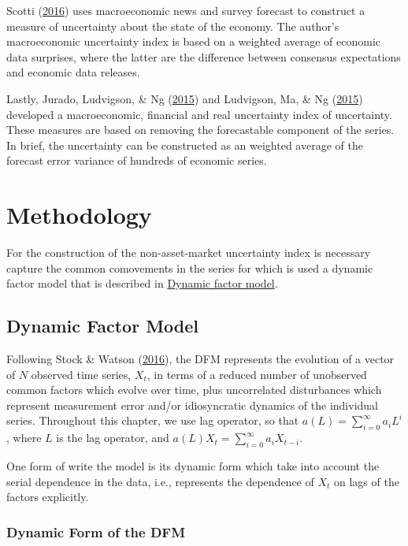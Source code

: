 \documentclass[12pt,twoside]{reedthesis}
\begin{document}
Scotti (\protect\hyperlink{ref-scotti:2016}{2016}) uses macroeconomic news and survey forecast to construct a measure of uncertainty about the state of the economy. The author's macroeconomic uncertainty index is based on a weighted average of economic data surprises, where the latter are the difference between consensus expectations and economic data releases.

Lastly, Jurado, Ludvigson, \& Ng (\protect\hyperlink{ref-juraetal:2015}{2015}) and Ludvigson, Ma, \& Ng (\protect\hyperlink{ref-ludvetal:2015}{2015}) developed a macroeconomic, financial and real uncertainty index of uncertainty. These measures are based on removing the forecastable component of the series. In brief, the uncertainty can be constructed as an weighted average of the forecast error variance of hundreds of economic series.

\hypertarget{methodology}{%
\chapter{Methodology}\label{methodology}}

For the construction of the non-asset-market uncertainty index is necessary capture the common comovements in the series for which is used a dynamic factor model that is described in \protect\hyperlink{dynamic-factor-model}{Dynamic factor model}.

\hypertarget{dynamic-factor-model}{%
\section{Dynamic Factor Model}\label{dynamic-factor-model}}

Following Stock \& Watson (\protect\hyperlink{ref-stocwats:2016}{2016}), the DFM represents the evolution of a vector of \(N\) observed time series, \(X_{t}\), in terms of a reduced number of unobserved common factors which evolve over time, plus uncorrelated disturbances which represent measurement error and/or idiosyncratic dynamics of the individual series. Throughout this chapter, we use lag operator, so that \(a(L) = \sum_{i = 0}^{\infty} a_{i}L^{i}\), where \(L\) is the lag operator, and \(a(L)X_{t} = \sum_{i = 0}^{\infty} a_{i}X_{t - i}\).

One form of write the model is its dynamic form which take into account the serial dependence in the data, i.e., represents the dependence of \(X_{t}\) on lags of the factors explicitly.

\hypertarget{dynamic-form-of-the-dfm}{%
\subsection{Dynamic Form of the DFM}\label{dynamic-form-of-the-dfm}}
\end{document}
